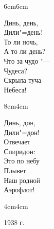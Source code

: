 \begin{adjustwidth}{6cm}{6cm}
\begin{flushleft}
Динь, день,\\
Дили"=день!\\
То ли ночь,\\
А то ли день?\\
Что за чудо "---\\
Чудеса?\\
Скрыла туча\\
Небеса!
\end{flushleft}
\end{adjustwidth}

\begin{adjustwidth}{8cm}{4cm}
\begin{flushleft}
Динь, дон,\\
Дили"=дон!\\
Отвечает\\
Спиридон:\\
Это по небу\\
Плывет\\
Наш родной\\
Аэрофлот!
\end{flushleft}
\end{adjustwidth}

\vspace{1cm}

\begin{adjustwidth}{4cm}{4cm}
\begin{flushright}
1938 г.
\end{flushright}
\end{adjustwidth}